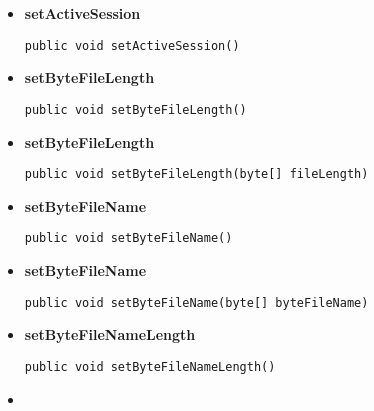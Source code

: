 {{{{{\begin{itemize}
{\begin{itemize}
{Resets a session.
}
\end{itemize}
}%
\item{ 
\hypertarget{filetransferUDP.FileTransfer.setActiveSession()}{{\bf  setActiveSession}\\}
\begin{lstlisting}[frame=none]
public void setActiveSession()\end{lstlisting} %
}%
\item{ 
\hypertarget{filetransferUDP.FileTransfer.setByteFileLength()}{{\bf  setByteFileLength}\\}
\begin{lstlisting}[frame=none]
public void setByteFileLength()\end{lstlisting} %
}%
\item{ 
\hypertarget{filetransferUDP.FileTransfer.setByteFileLength(byte[])}{{\bf  setByteFileLength}\\}
\begin{lstlisting}[frame=none]
public void setByteFileLength(byte[] fileLength)\end{lstlisting} %
}%
\item{ 
\hypertarget{filetransferUDP.FileTransfer.setByteFileName()}{{\bf  setByteFileName}\\}
\begin{lstlisting}[frame=none]
public void setByteFileName()\end{lstlisting} %
}%
\item{ 
\hypertarget{filetransferUDP.FileTransfer.setByteFileName(byte[])}{{\bf  setByteFileName}\\}
\begin{lstlisting}[frame=none]
public void setByteFileName(byte[] byteFileName)\end{lstlisting} %
}%
\item{ 
\hypertarget{filetransferUDP.FileTransfer.setByteFileNameLength()}{{\bf  setByteFileNameLength}\\}
\begin{lstlisting}[frame=none]
public void setByteFileNameLength()\end{lstlisting} %
}%
\item{ 
}
\end{itemize}}}}}}
